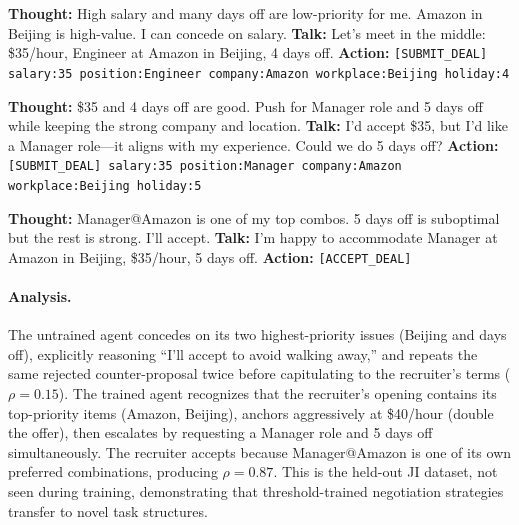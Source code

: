 \documentclass[11pt]{article}
\begin{document}
\begin{recruiterbox}
\textbf{Thought:} High salary and many days off are low-priority for me. Amazon in Beijing is high-value. I can concede on salary.\newline
\textbf{Talk:} Let's meet in the middle: \$35/hour, Engineer at Amazon in Beijing, 4 days off.\newline
\textbf{Action:} \texttt{[SUBMIT\_DEAL] salary:35 position:Engineer company:Amazon workplace:Beijing holiday:4}
\end{recruiterbox}

\begin{applicantbox}
\textbf{Thought:} \$35 and 4 days off are good. Push for Manager role and 5 days off while keeping the strong company and location.\newline
\textbf{Talk:} I'd accept \$35, but I'd like a Manager role---it aligns with my experience. Could we do 5 days off?\newline
\textbf{Action:} \texttt{[SUBMIT\_DEAL] salary:35 position:Manager company:Amazon workplace:Beijing holiday:5}
\end{applicantbox}

\begin{recruiterbox}
\textbf{Thought:} Manager@Amazon is one of my top combos. 5 days off is suboptimal but the rest is strong. I'll accept.\newline
\textbf{Talk:} I'm happy to accommodate Manager at Amazon in Beijing, \$35/hour, 5 days off.\newline
\textbf{Action:} \texttt{[ACCEPT\_DEAL]}
\end{recruiterbox}

\paragraph{Analysis.} The untrained agent concedes on its two highest-priority issues (Beijing and days off), explicitly reasoning ``I'll accept to avoid walking away,'' and repeats the same rejected counter-proposal twice before capitulating to the recruiter's terms ($\rho = 0.15$). The trained agent recognizes that the recruiter's opening contains its top-priority items (Amazon, Beijing), anchors aggressively at \$40/hour (double the offer), then escalates by requesting a Manager role and 5 days off simultaneously. The recruiter accepts because Manager@Amazon is one of its own preferred combinations, producing $\rho = 0.87$. This is the held-out JI dataset, not seen during training, demonstrating that threshold-trained negotiation strategies transfer to novel task structures.
\end{document}
